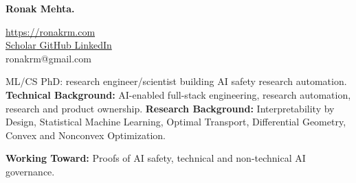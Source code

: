 \documentclass[]{article}
\title{}
\author{}
\date{}
\newif\ifpolicy
\begin{document}
\noindent
\begin{minipage}[t]{0.55\textwidth}
	\vspace{0pt}
	{\fontsize{32}{36}\selectfont\bf Ronak Mehta.}
\end{minipage}%
\hfill
\begin{minipage}[t]{0.4\textwidth}
	\vspace{0pt}
	\raggedleft
	\url{https://ronakrm.com} \\
	\href{https://scholar.google.com/citations?user=zFRqln4AAAAJ&hl=en}{ Scholar}\quad \href{https://github.com/ronakrm}{ GitHub}\quad \href{https://www.linkedin.com/in/ronak-mehta-64627491/}{ LinkedIn} \\
	ronakrm@gmail.com
\end{minipage}



\vspace{6pt}
\noindent ML/CS PhD: research engineer/scientist building AI safety research automation. \newline
\textbf{Technical Background:} AI-enabled full-stack engineering, research automation, research and product ownership. \newline
\textbf{Research Background:} Interpretability by Design, Statistical Machine Learning, Optimal Transport, Differential Geometry, Convex and Nonconvex Optimization. \newline
\ifpolicy
\textbf{Working Toward:} Technical AI Governance, Alignment Research Automation, Impossibility Proofs %
\else
\textbf{Working Toward:} Proofs of AI safety, technical and non-technical AI governance.
\fi
\end{document}
